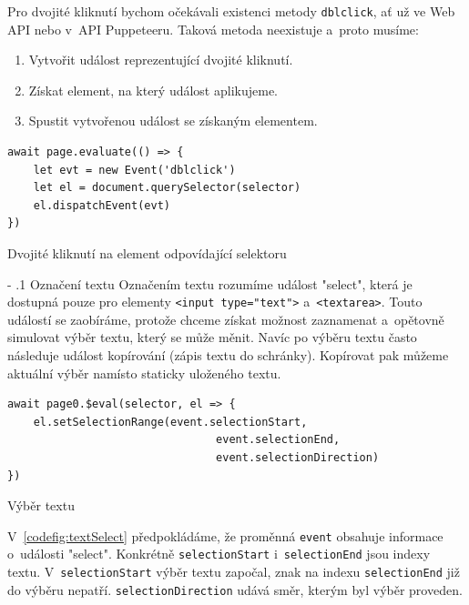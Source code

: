 \documentclass[12pt, a4paper, twoside]{article}
\makeatletter
\newcommand{\codefigureSpacing}{1.2}
\renewcommand\paragraph{%
	\@startsection{subparagraph}{5}{0mm}%
	{-\baselineskip}%
	{.1\baselineskip}%
	{\normalfont\normalsize\bfseries}}
\makeatother
\begin{document}
	Pro dvojité kliknutí bychom očekávali existenci metody \texttt{dblclick}, ať už ve Web API nebo v~API Puppeteeru. Taková metoda neexistuje a~proto musíme:
	\begin{enumerate}
		\item Vytvořit událost reprezentující dvojité kliknutí.
		\item Získat element, na který událost aplikujeme.
		\item Spustit vytvořenou událost se získaným elementem.
	\end{enumerate}
	\begin{codefigure}[H]
		\renewcommand\baselinestretch{\codefigureSpacing}
	\begin{lstlisting}[style=MyJavaScript]
await page.evaluate(() => { 
	let evt = new Event('dblclick')
	let el = document.querySelector(selector)
	el.dispatchEvent(evt) 
})
	\end{lstlisting}
	\caption{Dvojité kliknutí na element odpovídající selektoru}
\end{codefigure}	
	\paragraph{Označení textu}
	Označením textu rozumíme událost "select", která je dostupná pouze pro elementy \foreignlanguage{english}{\texttt{<input type="text">}} a~\texttt{<textarea>}. Touto událostí se zaobíráme, protože chceme získat možnost zaznamenat a~opětovně simulovat výběr textu, který se může měnit. Navíc po výběru textu často následuje událost kopírování (zápis textu do schránky). Kopírovat pak můžeme aktuální výběr namísto staticky uloženého textu.
	\begin{codefigure}[H]
		\renewcommand\baselinestretch{\codefigureSpacing}
	\begin{lstlisting}[style=MyJavaScript]
await page0.$eval(selector, el => { 
	el.setSelectionRange(event.selectionStart, 
	                            event.selectionEnd, 
	                            event.selectionDirection) 
})
	\end{lstlisting}
	\caption{Výběr textu}
	\label{codefig:textSelect}
	\end{codefigure}
V~\cref{codefig:textSelect} předpokládáme, že proměnná \texttt{event} obsahuje informace o~události "select". Konkrétně \texttt{selectionStart} i~\texttt{selectionEnd} jsou indexy textu. V~\texttt{selectionStart} výběr textu započal, znak na indexu \texttt{selectionEnd} již do výběru nepatří. \texttt{selectionDirection} udává směr, kterým byl výběr proveden.
\end{document}
